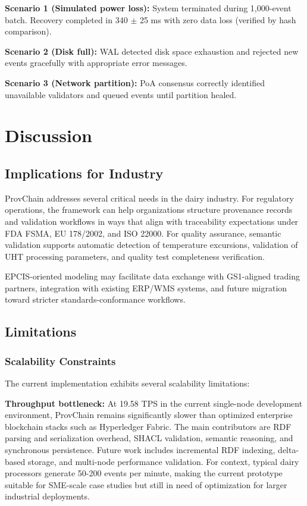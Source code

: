 \documentclass[preprint,review,12pt,authoryear]{elsarticle}
\begin{document}
\textbf{Scenario 1 (Simulated power loss):} System terminated during 1,000-event batch. Recovery completed in 340 $\pm$ 25 ms with zero data loss (verified by hash comparison).

\textbf{Scenario 2 (Disk full):} WAL detected disk space exhaustion and rejected new events gracefully with appropriate error messages.

\textbf{Scenario 3 (Network partition):} PoA consensus correctly identified unavailable validators and queued events until partition healed.

\section{Discussion}\label{sec:discussion}

\subsection{Implications for Industry}

ProvChain addresses several critical needs in the dairy industry. For regulatory operations, the framework can help organizations structure provenance records and validation workflows in ways that align with traceability expectations under FDA FSMA, EU 178/2002, and ISO 22000. For quality assurance, semantic validation supports automatic detection of temperature excursions, validation of UHT processing parameters, and quality test completeness verification.

EPCIS-oriented modeling may facilitate data exchange with GS1-aligned trading partners, integration with existing ERP/WMS systems, and future migration toward stricter standards-conformance workflows.

\subsection{Limitations}

\subsubsection{Scalability Constraints}

The current implementation exhibits several scalability limitations:

\textbf{Throughput bottleneck:} At 19.58 TPS in the current single-node development environment, ProvChain remains significantly slower than optimized enterprise blockchain stacks such as Hyperledger Fabric. The main contributors are RDF parsing and serialization overhead, SHACL validation, semantic reasoning, and synchronous persistence. Future work includes incremental RDF indexing, delta-based storage, and multi-node performance validation. For context, typical dairy processors generate 50-200 events per minute, making the current prototype suitable for SME-scale case studies but still in need of optimization for larger industrial deployments.
\end{document}
